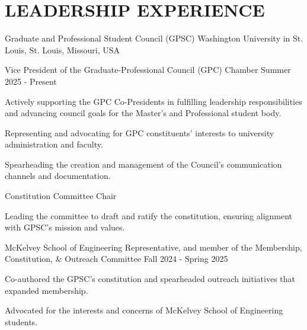 \documentclass[10pt, letterpaper]{article}
\begin{document}
\section{LEADERSHIP EXPERIENCE}

\begin{leadershipentry}
  {Graduate and Professional Student Council (GPSC)} %
  {Washington University in St. Louis, St. Louis, Missouri, USA} %
  \begin{positionentry}
    {Vice President of the Graduate-Professional Council (GPC) Chamber} %
    {Summer 2025 - Present} %
    \item Actively supporting the GPC Co-Presidents in fulfilling leadership responsibilities and advancing council goals for the Master's and Professional student body.
    \item Representing and advocating for GPC constituents' interests to university administration and faculty.
    \item Spearheading the creation and management of the Council's communication channels and documentation.
  \end{positionentry}
  \begin{positionentry}
    {Constitution Committee Chair} %
    {} %
    \item Leading the committee to draft and ratify the constitution, ensuring alignment with GPSC's mission and values.
  \end{positionentry}
  \begin{positionentry}
    {McKelvey School of Engineering Representative, and member of the Membership, Constitution, \& Outreach Committee} %
    {Fall 2024 - Spring 2025} %
    \item Co-authored the GPSC's constitution and spearheaded outreach initiatives that expanded membership.
    \item Advocated for the interests and concerns of McKelvey School of Engineering students.
  \end{positionentry}
\end{leadershipentry}
\end{document}

